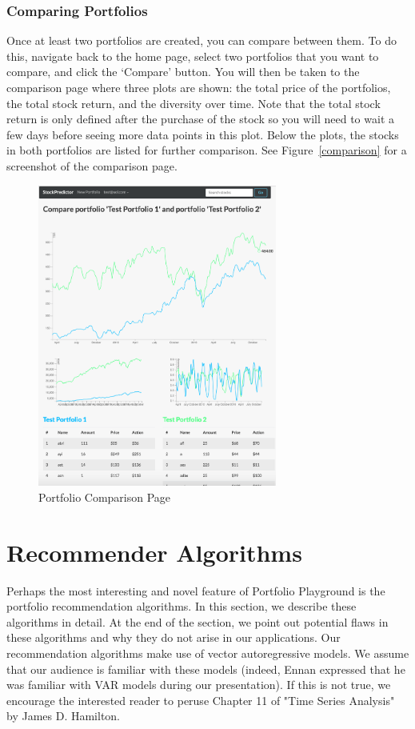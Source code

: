 \documentclass{article}
\begin{document}
\subsubsection{Comparing Portfolios}
Once at least two portfolios are created, you can compare between them. To do this, navigate back to the home page, select two portfolios that you want to compare, and click the `Compare' button. You will then be taken to the comparison page where three plots are shown: the total price of the portfolios, the total stock return, and the diversity over time. Note that the total stock return is only defined after the purchase of the stock so you will need to wait a few days before seeing more data points in this plot. Below the plots, the stocks in both portfolios are listed for further comparison. See Figure~\ref{comparison} for a screenshot of the comparison page.

\begin{figure}[H]
\begin{center}
\includegraphics[width=0.7\textwidth]{compare}
\caption{\label{fig:comparison} Portfolio Comparison Page}
\end{center}
\end{figure}

\section{Recommender Algorithms} \label{sec:alg}
Perhaps the most interesting and novel feature of Portfolio Playground is the portfolio recommendation algorithms. In this section, we describe these algorithms in detail. At the end of the section, we point out potential flaws in these algorithms and why they do not arise in our applications. Our recommendation algorithms make use of vector autoregressive models. We assume that our audience is familiar with these models (indeed, Ennan expressed that he was familiar with VAR models during our presentation). If this is not true, we encourage the interested reader to peruse Chapter 11 of "Time Series Analysis" by James D. Hamilton.
\end{document}
